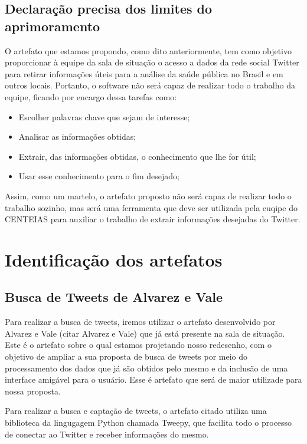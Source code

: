 \documentclass[12pt]{article}
\newcommand{\rascbegin}{\color{red}}    %
\newcommand{\rascend}{\color{black}}    %
\begin{document}
    
    
	\subsection{Declaração precisa dos limites do aprimoramento}
	
	O artefato que estamos propondo, como dito anteriormente, tem como objetivo proporcionar à equipe da sala de situação o acesso a dados da rede social Twitter para retirar informações úteis para a análise da saúde pública no Brasil e em outros locais. Portanto, o software não será capaz de realizar todo o trabalho da equipe, ficando por encargo dessa tarefas como: 
	\begin{itemize}
	    \item Escolher palavras chave que sejam de interesse;
	    \item Analisar as informações obtidas;
	    \item Extrair, das informações obtidas, o conhecimento que lhe for útil;
	    \item Usar esse conhecimento para o fim desejado;
	\end{itemize}
	Assim, como um martelo, o artefato proposto não será capaz de realizar todo o trabalho sozinho, mas será uma ferramenta que deve ser utilizada pela euqipe do CENTEIAS para auxiliar o trabalho de extrair informações desejadas do Twitter.
	
	
	
	\section{Identificação dos artefatos\label{Sec:CP:IdentifArtefatos}}
	\subsection{Busca de Tweets de Alvarez e Vale}
	Para realizar a busca de tweets, iremos utilizar o artefato desenvolvido por Alvarez e Vale \rascbegin(citar Alvarez e Vale) \rascend que já está presente na sala de situação. Este é o artefato sobre o qual estamos projetando nosso redesenho, com o objetivo de ampliar a sua proposta de busca de tweets por meio do processamento dos dados que já são obtidos pelo mesmo e da inclusão de uma interface amigável para o usuário. Esse é  artefato que será de maior utilizade para nossa proposta.
	
	Para realizar a busca e captação de tweets, o artefato citado utiliza uma biblioteca da lingugagem Python chamada Tweepy, que facilita todo o processo de conectar ao Twitter e receber informações do mesmo.
	
\end{document}
